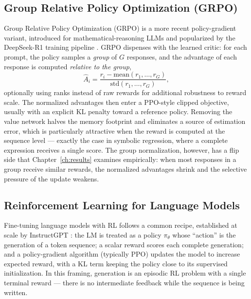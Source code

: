 \subsection{Group Relative Policy Optimization (GRPO)}
\label{sec:bg_grpo}

Group Relative Policy Optimization (GRPO) is a more recent policy-gradient variant, introduced for mathematical-reasoning LLMs \cite{shao2024deepseekmath} and popularized by the DeepSeek-R1 training pipeline \cite{deepseek_r1_2025}. GRPO dispenses with the learned critic: for each prompt, the policy samples a \emph{group} of $G$ responses, and the advantage of each response is computed \emph{relative to the group},
\begin{equation}
    \hat{A}_i = \frac{r_i - \mathrm{mean}(r_1, \ldots, r_G)}{\mathrm{std}(r_1, \ldots, r_G)},
    \label{eq:grpo_adv}
\end{equation}
optionally using ranks instead of raw rewards for additional robustness to reward scale. The normalized advantages then enter a PPO-style clipped objective, usually with an explicit KL penalty toward a reference policy. Removing the value network halves the memory footprint and eliminates a source of estimation error, which is particularly attractive when the reward is computed at the sequence level --- exactly the case in symbolic regression, where a complete expression receives a single score. The group normalization, however, has a flip side that Chapter~\ref{ch:results} examines empirically: when most responses in a group receive similar rewards, the normalized advantages shrink and the selective pressure of the update weakens.

\subsection{Reinforcement Learning for Language Models}
\label{sec:bg_rl_llm}

Fine-tuning language models with RL follows a common recipe, established at scale by InstructGPT \cite{ouyang_training_2022}: the LM is treated as a policy $\pi_\theta$ whose ``action'' is the generation of a token sequence; a scalar reward scores each complete generation; and a policy-gradient algorithm (typically PPO) updates the model to increase expected reward, with a KL term keeping the policy close to its supervised initialization. In this framing, generation is an episodic RL problem with a single terminal reward --- there is no intermediate feedback while the sequence is being written.

